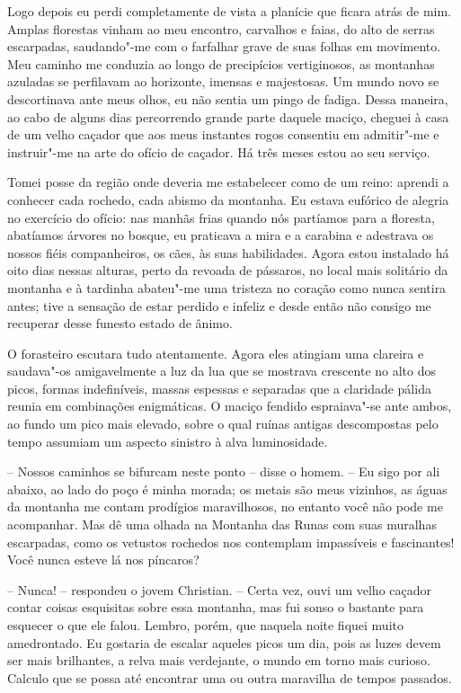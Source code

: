 Logo depois eu perdi completamente de vista a planície que ficara atrás
de mim. Amplas florestas vinham ao meu encontro, carvalhos e faias, do
alto de serras escarpadas, saudando"-me com o farfalhar grave de suas
folhas em movimento. Meu caminho me conduzia ao longo de precipícios
vertiginosos, as montanhas azuladas se perfilavam ao horizonte, imensas
e majestosas. Um mundo novo se descortinava ante meus olhos, eu não
sentia um pingo de fadiga. Dessa maneira, ao cabo de alguns dias
percorrendo grande parte daquele maciço, cheguei à casa de um velho
caçador que aos meus instantes rogos consentiu em admitir"-me e
instruir"-me na arte do ofício de caçador. Há três meses estou ao seu
serviço.

Tomei posse da região onde deveria me estabelecer como de um reino:
aprendi a conhecer cada rochedo, cada abismo da montanha. Eu estava
eufórico de alegria no exercício do ofício: nas manhãs frias quando nós
partíamos para a floresta, abatíamos árvores no bosque, eu praticava a
mira e a carabina e adestrava os nossos fiéis companheiros, os cães, às
suas habilidades. Agora estou instalado há oito dias nessas alturas,
perto da revoada de pássaros, no local mais solitário da montanha e à
tardinha abateu"-me uma tristeza no coração como nunca sentira antes;
tive a sensação de estar perdido e infeliz e desde então não consigo me
recuperar desse funesto estado de ânimo.

O forasteiro escutara tudo atentamente. Agora eles atingiam uma clareira
e saudava"-os amigavelmente a luz da lua que se mostrava crescente no
alto dos picos, formas indefiníveis, massas espessas e separadas que a
claridade pálida reunia em combinações enigmáticas. O maciço fendido
espraiava"-se ante ambos, ao fundo um pico mais elevado, sobre o qual
ruínas antigas descompostas pelo tempo assumiam um aspecto sinistro à
alva luminosidade.

-- Nossos caminhos se bifurcam neste ponto -- disse o homem. -- Eu sigo
por ali abaixo, ao lado do poço é minha morada; os metais são meus
vizinhos, as águas da montanha me contam prodígios maravilhosos, no
entanto você não pode me acompanhar. Mas dê uma olhada na Montanha
das Runas com suas muralhas escarpadas, como os vetustos rochedos nos
contemplam impassíveis e fascinantes! Você nunca esteve lá nos
píncaros?

-- Nunca! -- respondeu o jovem Christian. -- Certa vez, ouvi um velho
caçador contar coisas esquisitas sobre essa montanha, mas fui sonso o
bastante para esquecer o que ele falou. Lembro, porém, que naquela
noite fiquei muito amedrontado. Eu gostaria de escalar aqueles picos um
dia, pois as luzes devem ser mais brilhantes, a relva mais verdejante,
o mundo em torno mais curioso. Calculo que se possa até encontrar uma
ou outra maravilha de tempos passados.

